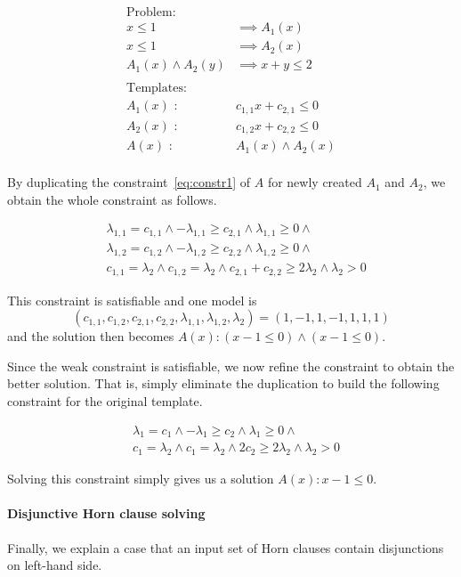 \begin{align*}
\text{Problem:} \\
x \leq 1 & \implies A_1(x) \\
x \leq 1 & \implies A_2(x) \\
A_1(x) \wedge A_2(y) & \implies x+y \leq 2 \\
\\
\text{Templates:} \\
A_1(x) \text{ : } & c_{1,1} x + c_{2,1} \leq 0 \\
A_2(x) \text{ : } & c_{1,2} x + c_{2,2} \leq 0 \\
A(x) \text{ : } & A_1(x) \wedge A_2(x) \\
\end{align*}

By duplicating the constraint~\ref{eq:constr1} of $A$ for newly
created $A_1$ and $A_2$, we obtain the whole constraint as follows.

\begin{align*}
& \lambda_{1,1} = c_{1,1} \wedge - \lambda_{1,1} \geq c_{2,1} \wedge \lambda_{1,1} \geq 0 \wedge \\
& \lambda_{1,2} = c_{1,2} \wedge - \lambda_{1,2} \geq c_{2,2} \wedge \lambda_{1,2} \geq 0 \wedge \\
& c_{1,1} = \lambda_2 \wedge c_{1,2} = \lambda_2 \wedge c_{2,1} + c_{2,2} \geq 2 \lambda_2 \wedge \lambda_2 > 0
\end{align*}

This constraint is satisfiable and one model is
\[ ( c_{1,1}, c_{1,2}, c_{2,1}, c_{2,2}, \lambda_{1,1}, \lambda_{1,2}, \lambda_2 ) =
( 1, -1, 1, -1, 1, 1, 1 ) \] and the solution then becomes
$A(x) : (x -1 \leq 0) \wedge (x -1 \leq 0)$.

Since the weak constraint is satisfiable, we now refine the constraint
to obtain the better solution.  That is, simply eliminate the
duplication to build the following constraint for the original
template.

\begin{align*}
& \lambda_1 = c_1 \wedge - \lambda_1 \geq c_2 \wedge \lambda_1 \geq 0 \wedge \\
& c_1 = \lambda_2 \wedge c_1 = \lambda_2 \wedge 2 c_2 \geq 2 \lambda_2 \wedge \lambda_2 > 0
\end{align*}

Solving this constraint simply gives us a solution
$A(x) : x -1 \leq 0$.

\paragraph {Disjunctive Horn clause solving}
Finally, we explain a case that an input set of Horn clauses contain
disjunctions on left-hand side.


